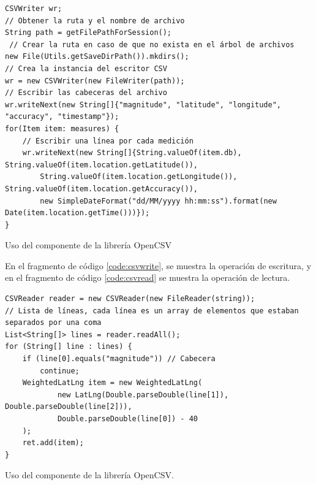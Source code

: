 \begin{listing}[h] 
\begin{verbatim}
CSVWriter wr;
// Obtener la ruta y el nombre de archivo 
String path = getFilePathForSession();
 // Crear la ruta en caso de que no exista en el árbol de archivos
new File(Utils.getSaveDirPath()).mkdirs(); 
// Crea la instancia del escritor CSV
wr = new CSVWriter(new FileWriter(path));
// Escribir las cabeceras del archivo
wr.writeNext(new String[]{"magnitude", "latitude", "longitude", "accuracy", "timestamp"});
for(Item item: measures) {
    // Escribir una línea por cada medición
    wr.writeNext(new String[]{String.valueOf(item.db), String.valueOf(item.location.getLatitude()),
        String.valueOf(item.location.getLongitude()), String.valueOf(item.location.getAccuracy()),
        new SimpleDateFormat("dd/MM/yyyy hh:mm:ss").format(new Date(item.location.getTime()))});
}
\end{verbatim}
\caption{Uso del componente  de la librería OpenCSV}
\label{code:csvwrite}
\end{listing}

    En el fragmento de código \ref{code:csvwrite}, se muestra la operación de escritura, y en el fragmento de código \ref{code:csvread} se muestra la operación de lectura. 

\begin{listing}[h] 
\begin{verbatim}
CSVReader reader = new CSVReader(new FileReader(string));
// Lista de líneas, cada línea es un array de elementos que estaban separados por una coma
List<String[]> lines = reader.readAll();
for (String[] line : lines) {
    if (line[0].equals("magnitude")) // Cabecera
        continue;
    WeightedLatLng item = new WeightedLatLng(
            new LatLng(Double.parseDouble(line[1]), Double.parseDouble(line[2])),
            Double.parseDouble(line[0]) - 40
    );
    ret.add(item);
}
\end{verbatim}
\caption{Uso del componente  de la librería OpenCSV.}
\label{code:csvread}
\end{listing}

\chapterend{}